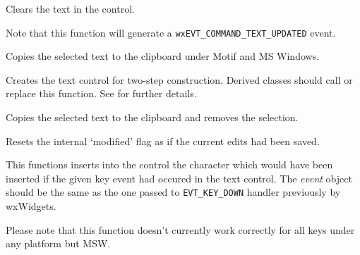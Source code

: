 
Clears the text in the control.

Note that this function will generate a {\tt wxEVT\_COMMAND\_TEXT\_UPDATED}
event.


\label{wxtextctrlcopy}


Copies the selected text to the clipboard under Motif and MS Windows.


\label{wxtextctrlcreate}


Creates the text control for two-step construction. Derived classes
should call or replace this function. See \rtfsp
for further details.


\label{wxtextctrlcut}


Copies the selected text to the clipboard and removes the selection.


\label{wxtextctrldiscardedits}


Resets the internal `modified' flag as if the current edits had been saved.


\label{wxtextctrlemulatekeypress}


This functions inserts into the control the character which would have been
inserted if the given key event had occured in the text control. The 
{\it event} object should be the same as the one passed to {\tt EVT\_KEY\_DOWN}
handler previously by wxWidgets.

Please note that this function doesn't currently work correctly for all keys
under any platform but MSW.


